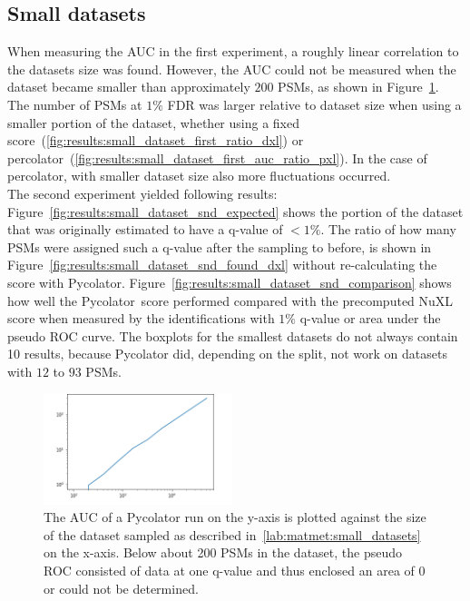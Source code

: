 \subsection{Small datasets}
\label{lab:results:small_datasets}
When measuring the AUC in the first experiment, a roughly linear correlation to the datasets size was found. However, the AUC could not be measured when the dataset became smaller than approximately $200$ PSMs, as shown in Figure~\ref{fig:results:small_dataset_first_auc}. The number of PSMs at $1\%$ FDR was larger relative to dataset size when using a smaller portion of the dataset, whether using a fixed score~(\ref{fig:results:small_dataset_first_ratio_dxl}) or percolator~(\ref{fig:results:small_dataset_first_auc_ratio_pxl}). In the case of percolator, with smaller dataset size also more fluctuations occurred.\\
The second experiment yielded following results: Figure~\ref{fig:results:small_dataset_snd_expected} shows the portion of the dataset that was originally estimated to have a q-value of $<1\%$. The ratio of how many PSMs were assigned such a q-value after the sampling to before, is shown in Figure~\ref{fig:results:small_dataset_snd_found_dxl} without re-calculating the score with Pycolator. Figure~\ref{fig:results:small_dataset_snd_comparison} shows how well the Pycolator~score performed compared with the precomputed NuXL score when measured by the identifications with $1\%$ q-value or area under the pseudo ROC curve. The boxplots for the smallest datasets do not always contain 10 results, because Pycolator did, depending on the split, not work on datasets with $12$ to $93$ PSMs.\\
\renewcommand{\baselinestretch}{0.9}
\begin{figure}
	\normalsize
	\centering
	\includegraphics[width = 0.49\textwidth]{figures/aucs_perc.png}
	\caption[Correlation between AUC and dataset size]{The AUC of a Pycolator run on the y-axis is plotted against the size of the dataset sampled as described in~\ref{lab:matmet:small_datasets} on the x-axis. Below about 200 PSMs in the dataset, the pseudo ROC consisted of data at one q-value and thus enclosed an area of 0 or could not be determined.}
	\label{fig:results:small_dataset_first_auc}
\end{figure}

